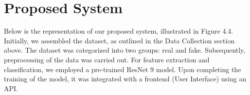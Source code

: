 \section{Proposed System}
Below is the representation of our proposed system, illustrated in Figure 4.4. Initially, we assembled the dataset, as outlined in the Data Collection section above. The dataset was categorized into two groups: real and fake. Subsequently, preprocessing of the data was carried out. For feature extraction and classification, we employed a pre-trained ResNet 9 model. Upon completing the training of the model, it was integrated with a frontend (User Interface) using an API.
\vspace{20pt}
\begin{figure}[hbt!]
\end{figure}